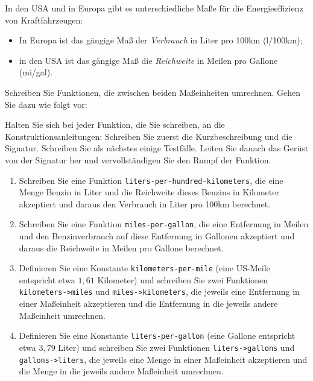 \begin{aufgabe}

  In den USA und in Europa gibt es unterschiedliche
  Maße für die Energieeffizienz von Kraftfahrzeugen:
  \begin{itemize}
  \item In Europa ist das gängige Maß der \emph{Verbrauch} in Liter
    pro 100km (l/100km);
  \item in den USA ist das gängige Maß die \emph{Reichweite} in Meilen
    pro Gallone (mi/gal).
  \end{itemize}
  Schreiben Sie Funktionen, die zwischen beiden Maßeinheiten
  umrechnen.  Gehen Sie dazu wie folgt vor:

  Halten Sie sich bei jeder Funktion, die Sie schreiben, an die
  Konstruktionsanleitungen: Schreiben Sie zuerst die Kurzbeschreibung
  und die Signatur.  Schreiben Sie als nächstes einige Testfälle.
  Leiten Sie danach das Gerüst von der Signatur her und vervollständigen
  Sie den Rumpf der Funktion.

  \begin{enumerate}

  \item Schreiben Sie eine Funktion
    \texttt{liters-per-hundred-kilometers}, die eine Menge Benzin in
    Liter und die Reichweite dieses Benzins in Kilometer akzeptiert
    und daraus den Verbrauch in Liter pro 100km berechnet.

  \item Schreiben Sie eine Funktion
    \texttt{miles-per-gallon}, die eine Entfernung in Meilen und den
    Benzinverbrauch auf diese Entfernung in Gallonen akzeptiert und
    daraus die Reichweite in Meilen pro Gallone berechnet.

  \item Definieren Sie eine Konstante
    \texttt{kilometers-per-mile} (eine US-Meile entspricht etwa $1,61$
    Kilometer) und schreiben Sie zwei Funktionen
    \texttt{kilometers->miles} und \texttt{miles->kilometers}, die
    jeweils eine Entfernung in einer Maßeinheit akzeptieren und die
    Entfernung in die jeweils andere Maßeinheit umrechnen.

  \item Definieren Sie eine Konstante
    \texttt{liters-per-gallon} (eine Gallone entspricht etwa $3,79$
    Liter) und schreiben Sie zwei Funktionen \texttt{liters->gallons}
    und \texttt{gallons->liters}, die jeweils eine Menge in einer
    Maßeinheit akzeptieren und die Menge in die jeweils andere
    Maßeinheit umrechnen.


\end{enumerate}
\end{aufgabe}
